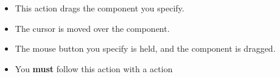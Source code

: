 

\begin{itemize}
\item This action drags the component you specify.
\item The cursor is moved over the component.
\item The mouse button you specify is held, and the component is dragged. 
\item You \textbf{must} follow this action with a  action
\end{itemize}


